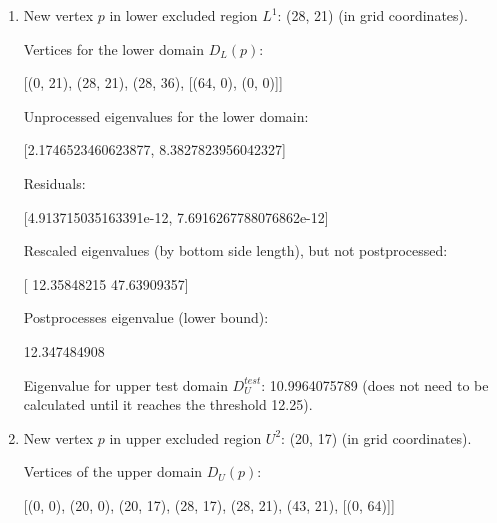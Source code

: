 \documentclass{article}
\begin{document}
\begin{enumerate}
\newpage
\item New vertex $p$ in lower excluded region $L^{1}$:
(28, 21) (in grid coordinates).

Vertices for the lower domain $D_L(p)$:

[(0, 21), (28, 21), (28, 36), [(64, 0), (0, 0)]]

Unprocessed eigenvalues for the lower domain:

[2.1746523460623877, 8.3827823956042327]

Residuals:

[4.913715035163391e-12, 7.6916267788076862e-12]

Rescaled eigenvalues (by bottom side length), but not postprocessed:

[ 12.35848215  47.63909357]

Postprocesses eigenvalue (lower bound):

12.347484908

Eigenvalue for upper test domain $D_U^{test}$: 10.9964075789 (does not need to
be calculated until it reaches the threshold 12.25).


\newpage
\item New vertex $p$ in upper excluded region $U^{2}$:
(20, 17) (in grid coordinates).

Vertices of the upper domain $D_U(p)$:

[(0, 0), (20, 0), (20, 17), (28, 17), (28, 21), (43, 21), [(0, 64)]]


\end{enumerate}
\end{document}
